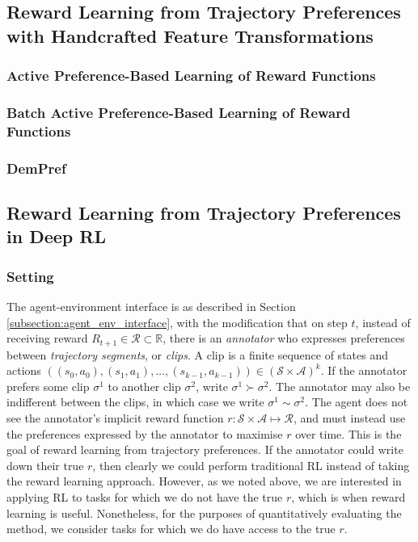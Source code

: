 \documentclass[11pt, a4paper, bibliography=totoc]{report}
\newcommand{\reals}{\mathbb{R}}
\begin{document}
\subsection{Reward Learning from Trajectory Preferences with Handcrafted Feature Transformations}

\subsubsection{Active Preference-Based Learning of Reward Functions}

\subsubsection{Batch Active Preference-Based Learning of Reward Functions}

\subsubsection{DemPref}

\subsection{Reward Learning from Trajectory Preferences in Deep RL}

\subsubsection{Setting}
The agent-environment interface is as described in Section \ref{subsection:agent_env_interface}, with the modification that on step $ t $, instead of receiving reward $ R_{t+1} \in \mathcal{R} \subset \reals $, there is an \textit{annotator} who expresses preferences between \textit{trajectory segments}, or \textit{clips}. A clip is a finite sequence of states and actions $ ((s_0,a_0), (s_1,a_1),\dots,(s_{k-1},a_{k-1})) \in (\mathcal{S} \times \mathcal{A})^k $. If the annotator prefers some clip $ \sigma^1 $ to another clip $ \sigma^2 $, write $ \sigma^1 \succ \sigma^2 $. The annotator may also be indifferent between the clips, in which case we write $ \sigma^1 \sim \sigma^2 $. The agent does not see the annotator's implicit reward function $ r : \mathcal{S} \times \mathcal{A} \mapsto \mathcal{R} $, and must instead use the preferences expressed by the annotator to maximise $ r $ over time. This is the goal of reward learning from trajectory preferences.
If the annotator could write down their true $ r $, then clearly we could perform traditional RL instead of taking the reward learning approach. However, as we noted above, we are interested in applying RL to tasks for which we do not have the true $ r $, which is when reward learning is useful. Nonetheless, for the purposes of quantitatively evaluating the method, we consider tasks for which we do have access to the true $ r $.
\end{document}
